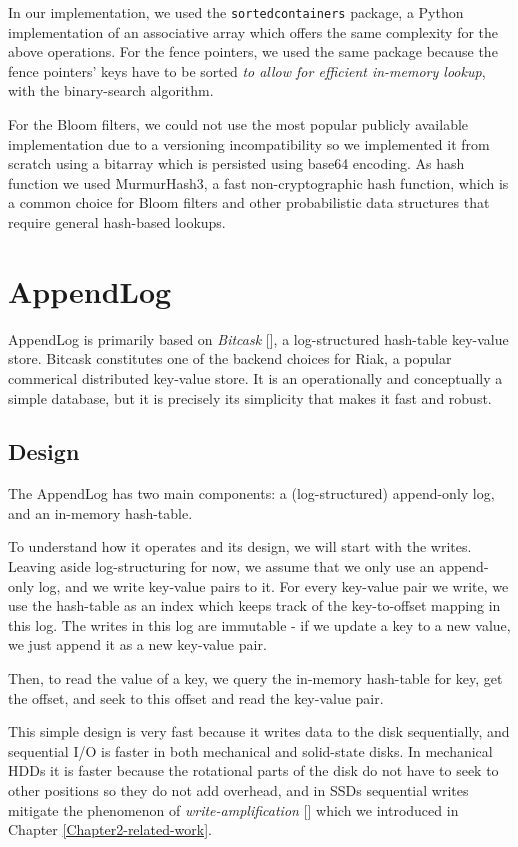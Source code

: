 In our implementation, we used the \verb|sortedcontainers| package, a Python implementation of an associative array which offers the same complexity for the above operations. For the fence pointers, we used the same package because the fence pointers' keys have to be sorted \textit{to allow for efficient in-memory lookup}, with the binary-search algorithm.

For the Bloom filters, we could not use the most popular publicly available implementation due to a versioning incompatibility so we implemented it from scratch using a bitarray which is persisted using base64 encoding. As hash function we used MurmurHash3, a fast non-cryptographic hash function, which is a common choice for Bloom filters and other probabilistic data structures that require general hash-based lookups.

\section{AppendLog}

AppendLog is primarily based on \textit{Bitcask} [\cite{bitcask}], a log-structured hash-table key-value store. Bitcask constitutes one of the backend choices for Riak, a popular commerical distributed key-value store. It is an operationally and conceptually a simple database, but it is precisely its simplicity that makes it fast and robust.

\subsection{Design}

The AppendLog has two main components: a (log-structured) append-only log, and an in-memory hash-table.

To understand how it operates and its design, we will start with the writes.
Leaving aside log-structuring for now, we assume that we only use an append-only log, and we write key-value pairs to it.
For every key-value pair we write, we use the hash-table as an index which keeps track of the key-to-offset mapping in this log. The writes in this log are immutable - if we update a key to a new value, we just append it as a new key-value pair.

Then, to read the value of a key, we query the in-memory hash-table for key, get the offset, and seek to this offset and read the key-value pair.

This simple design is very fast because it writes data to the disk sequentially, and sequential I/O is faster in both mechanical and solid-state disks. In mechanical HDDs it is faster because the rotational parts of the disk do not have to seek to other positions so they do not add overhead, and in SSDs sequential writes mitigate the phenomenon of \textit{write-amplification} [\cite{write-amplification}] which we introduced in Chapter \ref{Chapter2-related-work}.

